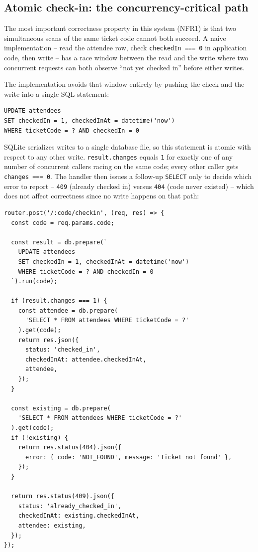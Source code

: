 ﻿\documentclass[11pt,letterpaper]{report}
\newcommand{\code}[1]{\lstinline[breaklines=true]{#1}}
\begin{document}
\subsection{Atomic check-in: the concurrency-critical path}
\label{sec:concurrency-impl}

The most important correctness property in this system (NFR1) is that
two simultaneous scans of the same ticket code cannot both succeed. A
naive implementation -- read the attendee row, check
\code{checkedIn === 0} in application code, then write -- has a race
window between the read and the write where two concurrent requests
can both observe ``not yet checked in'' before either writes.

The implementation avoids that window entirely by pushing the check
and the write into a single SQL statement:

\begin{lstlisting}[caption={Atomic conditional check-in update}]
UPDATE attendees
SET checkedIn = 1, checkedInAt = datetime('now')
WHERE ticketCode = ? AND checkedIn = 0
\end{lstlisting}

SQLite serializes writes to a single database file, so this statement
is atomic with respect to any other write. \code{result.changes}
equals \code{1} for exactly one of any number of concurrent callers
racing on the same code; every other caller gets \code{changes === 0}.
The handler then issues a follow-up \code{SELECT} only to decide which
error to report -- \code{409} (already checked in) versus \code{404}
(code never existed) -- which does not affect correctness since no
write happens on that path:

\begin{lstlisting}[caption={tickets.js -- POST /tickets/:code/checkin}]
router.post('/:code/checkin', (req, res) => {
  const code = req.params.code;

  const result = db.prepare(`
    UPDATE attendees
    SET checkedIn = 1, checkedInAt = datetime('now')
    WHERE ticketCode = ? AND checkedIn = 0
  `).run(code);

  if (result.changes === 1) {
    const attendee = db.prepare(
      'SELECT * FROM attendees WHERE ticketCode = ?'
    ).get(code);
    return res.json({
      status: 'checked_in',
      checkedInAt: attendee.checkedInAt,
      attendee,
    });
  }

  const existing = db.prepare(
    'SELECT * FROM attendees WHERE ticketCode = ?'
  ).get(code);
  if (!existing) {
    return res.status(404).json({
      error: { code: 'NOT_FOUND', message: 'Ticket not found' },
    });
  }

  return res.status(409).json({
    status: 'already_checked_in',
    checkedInAt: existing.checkedInAt,
    attendee: existing,
  });
});
\end{lstlisting}
\end{document}
